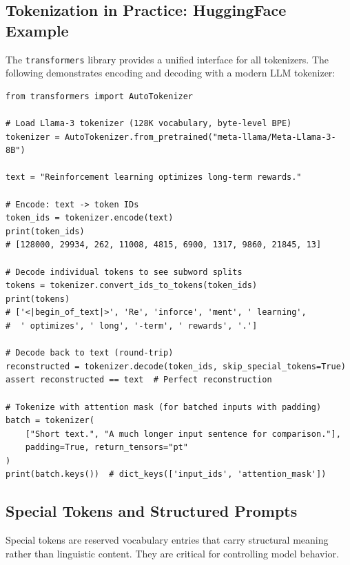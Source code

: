 \subsection{Tokenization in Practice: HuggingFace Example}
\label{tokenization-in-practice-huggingface-example}

The \texttt{transformers} library provides a unified interface for all tokenizers. The following demonstrates encoding and decoding with a modern LLM tokenizer:

\begin{lstlisting}[style=pythonstyle, caption={Tokenization encode/decode with HuggingFace Transformers.}]
from transformers import AutoTokenizer

# Load Llama-3 tokenizer (128K vocabulary, byte-level BPE)
tokenizer = AutoTokenizer.from_pretrained("meta-llama/Meta-Llama-3-8B")

text = "Reinforcement learning optimizes long-term rewards."

# Encode: text -> token IDs
token_ids = tokenizer.encode(text)
print(token_ids)
# [128000, 29934, 262, 11008, 4815, 6900, 1317, 9860, 21845, 13]

# Decode individual tokens to see subword splits
tokens = tokenizer.convert_ids_to_tokens(token_ids)
print(tokens)
# ['<|begin_of_text|>', 'Re', 'inforce', 'ment', ' learning',
#  ' optimizes', ' long', '-term', ' rewards', '.']

# Decode back to text (round-trip)
reconstructed = tokenizer.decode(token_ids, skip_special_tokens=True)
assert reconstructed == text  # Perfect reconstruction

# Tokenize with attention mask (for batched inputs with padding)
batch = tokenizer(
    ["Short text.", "A much longer input sentence for comparison."],
    padding=True, return_tensors="pt"
)
print(batch.keys())  # dict_keys(['input_ids', 'attention_mask'])
\end{lstlisting}

\subsection{Special Tokens and Structured Prompts}
\label{special-tokens-and-structured-prompts}

Special tokens are reserved vocabulary entries that carry structural meaning rather than linguistic content. They are critical for controlling model behavior.

